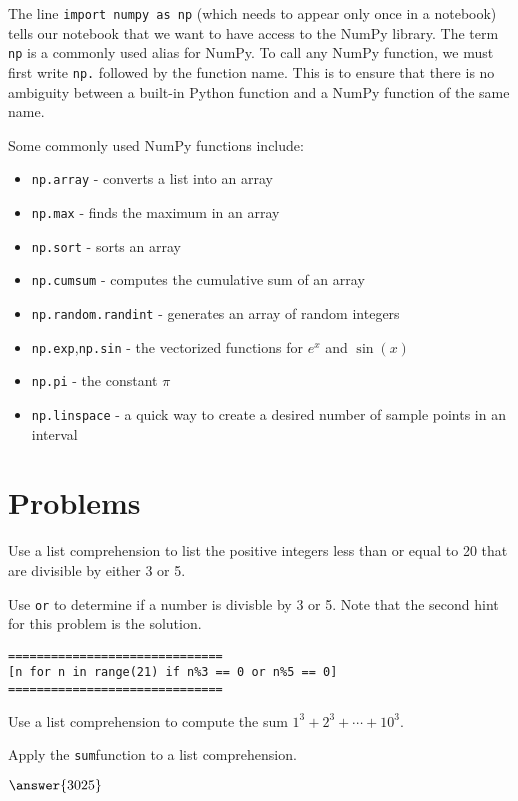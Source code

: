 \documentclass{ximera}
\begin{document}
The line \verb|import numpy as np| (which needs to appear only once in a notebook) tells our notebook that we want to have access to the NumPy library. The term \verb|np| is a commonly used alias for NumPy. To call any NumPy function, we must first write \verb|np.| followed by the function name. This is to ensure that there is no ambiguity between a built-in Python function and a NumPy function of the same name.

Some commonly used NumPy functions include:

\begin{itemize}
	\item \verb|np.array| - converts a list into an array
	\item \verb|np.max| - finds the maximum in an array
	\item \verb|np.sort| - sorts an array
	\item \verb|np.cumsum| - computes the cumulative sum of an array
	\item \verb|np.random.randint| - generates an array of random integers
	\item \verb|np.exp|,\verb|np.sin| - the vectorized functions for $e^x$ and $\sin(x)$
	\item \verb|np.pi| - the constant $\pi$
	\item \verb|np.linspace| - a quick way to create a desired number of sample points in an interval
\end{itemize}

\section{Problems}

\begin{question}
Use a list comprehension to list the positive integers less than or equal to 20 that are divisible by either 3 or 5.
	\begin{hint}
	Use \verb|or| to determine if a number is divisble by 3 or 5. Note that the second hint for this problem is the solution.
	\end{hint}
	\begin{hint}
\begin{verbatim}
==============================
[n for n in range(21) if n%3 == 0 or n%5 == 0]
==============================
\end{verbatim}
	\end{hint}
\end{question}

\begin{question}
Use a list comprehension to compute the sum $1^3+2^3+\cdots+10^3.$
	\begin{hint}
	Apply the \verb|sum|function to a list comprehension.
	\end{hint}
        $\answer{3025}$
\end{question}
\end{document}

